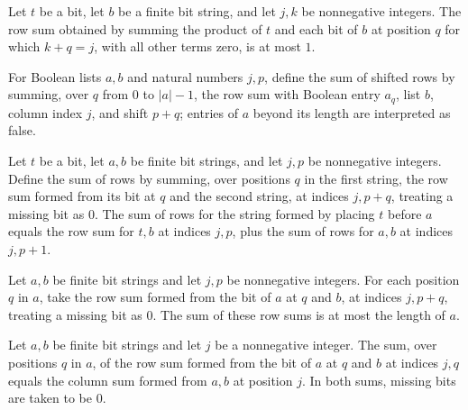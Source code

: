 \begin{lemma}
\label{Complexity.multRow_le_one}
\leanok
{}
Let $t$ be a bit, let $b$ be a finite bit string, and let $j,k$ be nonnegative integers.
The row sum obtained by summing the product of $t$ and each bit of $b$ at position $q$
for which $k+q=j$, with all other terms zero, is at most $1$.
\end{lemma}

\begin{definition}
\label{Complexity.multRows}
\leanok
{}
For Boolean lists $a,b$ and natural numbers $j,p$, define the sum of shifted rows by
summing, over $q$ from $0$ to $|a|-1$, the row sum with Boolean entry $a_q$, list $b$,
column index $j$, and shift $p+q$; entries of $a$ beyond its length are interpreted as
false.
\end{definition}

\begin{lemma}
\label{Complexity.multRows_cons}
\leanok
{}
Let $t$ be a bit, let $a,b$ be finite bit strings, and let $j,p$ be nonnegative
integers. Define the sum of rows by summing, over positions $q$ in the first string, the
row sum formed from its bit at $q$ and the second string, at indices $j,p+q$, treating a
missing bit as $0$. The sum of rows for the string formed by placing $t$ before $a$
equals the row sum for $t,b$ at indices $j,p$, plus the sum of rows for $a,b$ at indices
$j,p+1$.
\end{lemma}

\begin{lemma}
\label{Complexity.multRows_bound}
\leanok
{}
Let $a,b$ be finite bit strings and let $j,p$ be nonnegative integers. For each position
$q$ in $a$, take the row sum formed from the bit of $a$ at $q$ and $b$, at indices
$j,p+q$, treating a missing bit as $0$. The sum of these row sums is at most the length
of $a$.
\end{lemma}

\begin{lemma}
\label{Complexity.multRows_column}
\leanok
{}
Let $a,b$ be finite bit strings and let $j$ be a nonnegative integer. The sum, over
positions $q$ in $a$, of the row sum formed from the bit of $a$ at $q$ and $b$ at
indices $j,q$ equals the column sum formed from $a,b$ at position $j$. In both sums,
missing bits are taken to be $0$.
\end{lemma}

